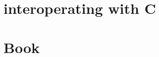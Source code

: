 \documentclass[svgnames,12pt,a4paper]{report}
\begin{document}
\chapter{interoperating with C}
\label{sec:inter-with-c}



\chapter{Book}










\end{document}
